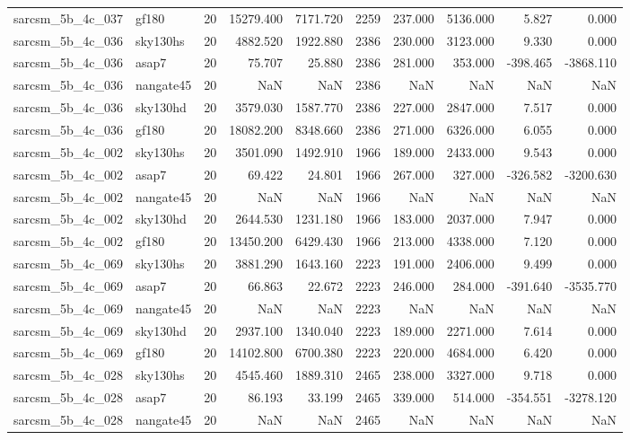 \begin{tabular}{llrrrrrrrr}
sarcsm\_5b\_4c\_037 & gf180 & 20 & 15279.400 & 7171.720 & 2259 & 237.000 & 5136.000 & 5.827 & 0.000 \\
sarcsm\_5b\_4c\_036 & sky130hs & 20 & 4882.520 & 1922.880 & 2386 & 230.000 & 3123.000 & 9.330 & 0.000 \\
sarcsm\_5b\_4c\_036 & asap7 & 20 & 75.707 & 25.880 & 2386 & 281.000 & 353.000 & -398.465 & -3868.110 \\
sarcsm\_5b\_4c\_036 & nangate45 & 20 & NaN & NaN & 2386 & NaN & NaN & NaN & NaN \\
sarcsm\_5b\_4c\_036 & sky130hd & 20 & 3579.030 & 1587.770 & 2386 & 227.000 & 2847.000 & 7.517 & 0.000 \\
sarcsm\_5b\_4c\_036 & gf180 & 20 & 18082.200 & 8348.660 & 2386 & 271.000 & 6326.000 & 6.055 & 0.000 \\
sarcsm\_5b\_4c\_002 & sky130hs & 20 & 3501.090 & 1492.910 & 1966 & 189.000 & 2433.000 & 9.543 & 0.000 \\
sarcsm\_5b\_4c\_002 & asap7 & 20 & 69.422 & 24.801 & 1966 & 267.000 & 327.000 & -326.582 & -3200.630 \\
sarcsm\_5b\_4c\_002 & nangate45 & 20 & NaN & NaN & 1966 & NaN & NaN & NaN & NaN \\
sarcsm\_5b\_4c\_002 & sky130hd & 20 & 2644.530 & 1231.180 & 1966 & 183.000 & 2037.000 & 7.947 & 0.000 \\
sarcsm\_5b\_4c\_002 & gf180 & 20 & 13450.200 & 6429.430 & 1966 & 213.000 & 4338.000 & 7.120 & 0.000 \\
sarcsm\_5b\_4c\_069 & sky130hs & 20 & 3881.290 & 1643.160 & 2223 & 191.000 & 2406.000 & 9.499 & 0.000 \\
sarcsm\_5b\_4c\_069 & asap7 & 20 & 66.863 & 22.672 & 2223 & 246.000 & 284.000 & -391.640 & -3535.770 \\
sarcsm\_5b\_4c\_069 & nangate45 & 20 & NaN & NaN & 2223 & NaN & NaN & NaN & NaN \\
sarcsm\_5b\_4c\_069 & sky130hd & 20 & 2937.100 & 1340.040 & 2223 & 189.000 & 2271.000 & 7.614 & 0.000 \\
sarcsm\_5b\_4c\_069 & gf180 & 20 & 14102.800 & 6700.380 & 2223 & 220.000 & 4684.000 & 6.420 & 0.000 \\
sarcsm\_5b\_4c\_028 & sky130hs & 20 & 4545.460 & 1889.310 & 2465 & 238.000 & 3327.000 & 9.718 & 0.000 \\
sarcsm\_5b\_4c\_028 & asap7 & 20 & 86.193 & 33.199 & 2465 & 339.000 & 514.000 & -354.551 & -3278.120 \\
sarcsm\_5b\_4c\_028 & nangate45 & 20 & NaN & NaN & 2465 & NaN & NaN & NaN & NaN \\

\end{tabular}
